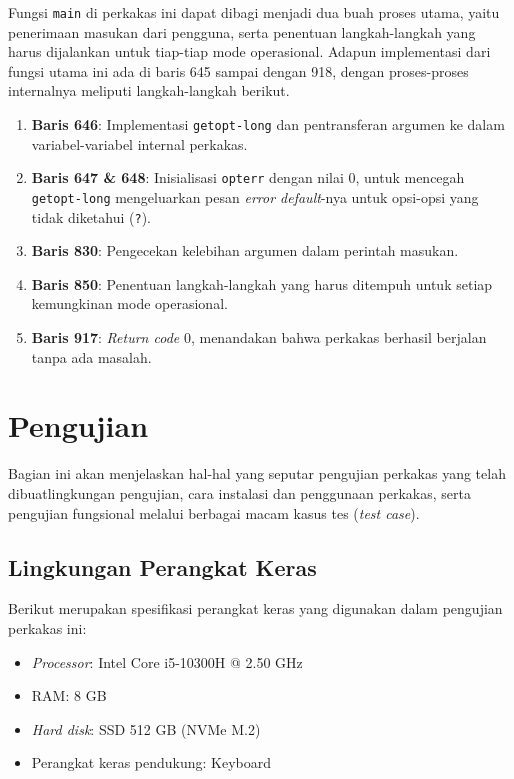 Fungsi \verb|main| di perkakas ini dapat dibagi menjadi dua buah proses utama, yaitu penerimaan masukan dari pengguna, serta penentuan langkah-langkah yang harus dijalankan untuk tiap-tiap mode operasional. Adapun implementasi dari fungsi utama ini ada di baris 645 sampai dengan 918, dengan proses-proses internalnya meliputi langkah-langkah berikut.

\begin{enumerate}
	\item \textbf{Baris 646}: Implementasi \verb|getopt-long| dan pentransferan argumen ke dalam variabel-variabel internal perkakas.
	\item \textbf{Baris 647 \& 648}: Inisialisasi \verb|opterr| dengan nilai 0, untuk mencegah \verb|getopt-long| mengeluarkan pesan \textit{error default}-nya untuk opsi-opsi yang tidak diketahui (\textquotesingle\verb|?|\textquotesingle). 
	\item \textbf{Baris 830}: Pengecekan kelebihan argumen dalam perintah masukan.
	\item \textbf{Baris 850}: Penentuan langkah-langkah yang harus ditempuh untuk setiap kemungkinan mode operasional.
	\item \textbf{Baris 917}: \textit{Return code} 0, menandakan bahwa perkakas berhasil berjalan tanpa ada masalah.
\end{enumerate}

\section{Pengujian}
\label{sec:testing-experiments}

Bagian ini akan menjelaskan hal-hal yang seputar pengujian perkakas yang telah dibuat\textemdash lingkungan pengujian, cara instalasi dan penggunaan perkakas, serta pengujian fungsional melalui berbagai macam kasus tes (\textit{test case}).

\subsection{Lingkungan Perangkat Keras}
\label{sec:testing-experiments-hardware}

Berikut merupakan spesifikasi perangkat keras yang digunakan dalam pengujian perkakas ini:

\begin{itemize}
	\item \textit{Processor}: Intel\logoregistered\xspace Core\logotrademark\xspace i5-10300H @ 2.50 GHz
	\item RAM: 8 GB
	\item \textit{Hard disk}: SSD 512 GB (NVMe\logotrademark\xspace M.2)
	\item Perangkat keras pendukung: Keyboard
\end{itemize}


